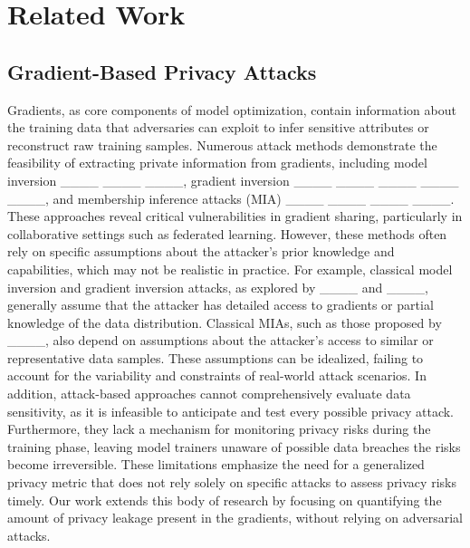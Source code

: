 \section{Related Work}

\subsection{Gradient-Based Privacy Attacks}

Gradients, as core components of model optimization, contain information about the training data that adversaries can exploit to infer sensitive attributes or reconstruct raw training samples. Numerous attack methods demonstrate the feasibility of extracting private information from gradients, including model inversion ____ ____ ____, gradient inversion ____ ____ ____ ____ ____, and membership inference attacks (MIA) ____ ____ ____ ____. These approaches reveal critical vulnerabilities in gradient sharing, particularly in collaborative settings such as federated learning. However, these methods often rely on specific assumptions about the attacker's prior knowledge and capabilities, which may not be realistic in practice. For example, classical model inversion and gradient inversion attacks, as explored by ____ and ____, generally assume that the attacker has detailed access to gradients or partial knowledge of the data distribution. Classical MIAs, such as those proposed by ____, also depend on assumptions about the attacker's access to similar or representative data samples. These assumptions can be idealized, failing to account for the variability and constraints of real-world attack scenarios. In addition, attack-based approaches cannot comprehensively evaluate data sensitivity, as it is infeasible to anticipate and test every possible privacy attack. Furthermore, they lack a mechanism for monitoring privacy risks during the training phase, leaving model trainers unaware of possible data breaches the risks become irreversible. These limitations emphasize the need for a generalized privacy metric that does not rely solely on specific attacks to assess privacy risks timely. Our work extends this body of research by focusing on quantifying the amount of privacy leakage present in the gradients, without relying on adversarial attacks.

